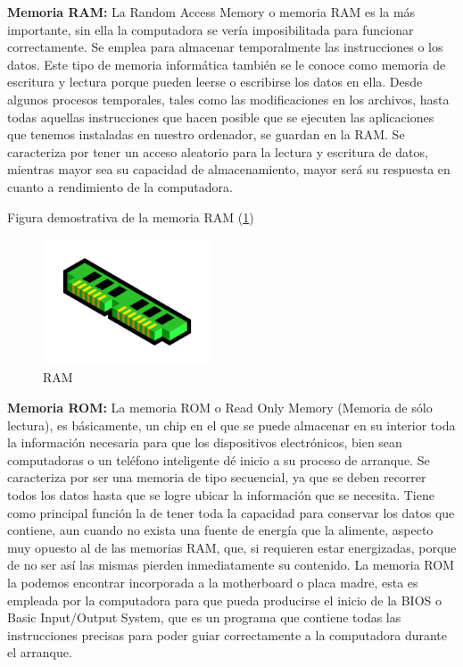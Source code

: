\documentclass{article}
\begin{document}
\textbf{Memoria RAM:}
La Random Access Memory o memoria RAM es la más importante, sin ella la computadora se vería imposibilitada para funcionar correctamente. Se emplea para almacenar temporalmente las instrucciones o los datos. Este tipo de memoria informática también se le conoce como memoria de escritura y lectura porque pueden leerse o escribirse los datos en ella. Desde algunos procesos temporales, tales como las modificaciones en los archivos, hasta todas aquellas instrucciones que hacen posible que se ejecuten las aplicaciones que tenemos instaladas en nuestro ordenador, se guardan en la RAM.\newline
Se caracteriza por tener un acceso aleatorio para la lectura y escritura de datos, mientras mayor sea su capacidad de almacenamiento, mayor será su respuesta en cuanto a rendimiento de la computadora.\newline

Figura demostrativa de la memoria RAM (\ref{fig_ram})\newline

\begin{figure}[h]
\includegraphics[width=5cm]{ram.png}
\centering
\caption{RAM}
\label{fig_ram}
\end{figure}

\textbf{Memoria ROM:}
La memoria ROM o Read Only Memory (Memoria de sólo lectura), es básicamente, un chip en el que se puede almacenar en su interior toda la información necesaria para que los dispositivos electrónicos, bien sean computadoras o un teléfono inteligente dé inicio a su proceso de arranque. Se caracteriza por ser una memoria de tipo secuencial, ya que se deben recorrer todos los datos hasta que se logre ubicar la información que se necesita. Tiene como principal función la de tener toda la capacidad para conservar los datos que contiene, aun cuando no exista una fuente de energía que la alimente, aspecto muy opuesto al de las memorias RAM, que, si requieren estar energizadas, porque de no ser así las mismas pierden inmediatamente su contenido.\newline
La memoria ROM la podemos encontrar incorporada a la motherboard o placa madre, esta es empleada por la computadora para que pueda producirse el inicio de la BIOS o Basic Input/Output System, que es un programa que contiene todas las instrucciones precisas para poder guiar correctamente a la computadora durante el arranque.\newline
\end{document}
